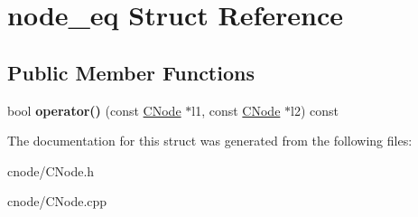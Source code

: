 \hypertarget{structnode__eq}{\section{node\-\_\-eq \-Struct \-Reference}
\label{structnode__eq}
}
\subsection*{\-Public \-Member \-Functions}
\begin{DoxyCompactItemize}
\item 
\hypertarget{structnode__eq_a96000e1dd0e3f726c05c4f98f98cd2b7}{bool {\bfseries operator()} (const \hyperlink{classCNode}{\-C\-Node} $\ast$l1, const \hyperlink{classCNode}{\-C\-Node} $\ast$l2) const }\label{structnode__eq_a96000e1dd0e3f726c05c4f98f98cd2b7}

\end{DoxyCompactItemize}


\-The documentation for this struct was generated from the following files\-:\begin{DoxyCompactItemize}
\item 
cnode/\-C\-Node.\-h\item 
cnode/\-C\-Node.\-cpp\end{DoxyCompactItemize}

